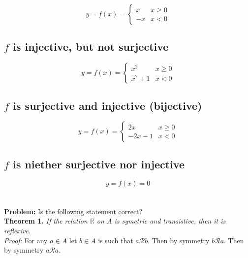 \documentclass[]{article}
\newcommand{\Rel}{\mathcal{R}}
\newcommand{\R}{\mathbb{R}}
\begin{document}
\begin{displaymath}
	y = f(x) =
	\begin{cases}
		x & x \geq 0\\
		-x & x < 0
	\end{cases}
\end{displaymath}


\subsection{$f$ is injective, but not surjective}
\begin{displaymath}
	y = f(x) =
	\begin{cases}
		x^2 & x \geq 0\\
		x^2 + 1 & x < 0
	\end{cases}
\end{displaymath}


\subsection{$f$ is surjective and injective (bijective)}


\begin{displaymath}
	y = f(x) =
	\begin{cases}
		2 x & x \geq 0\\
		-2 x - 1 & x < 0
	\end{cases}
\end{displaymath}


\subsection{$f$ is niether surjective nor injective}

\begin{displaymath}
	y = f(x) = 0
\end{displaymath}












\newpage
\section{}
\textbf{Problem:}
Is the following statement correct?\\

\textbf{Theorem 1.}
\textit{If the relation $\R$ on $A$ is symetric and transistive, then it is reflexive.}\\
\textit{Proof:}
For any $a \in A$ let $b \in A$ is such that $a \Rel b$. Then by symmetry $b \Rel a$. 
Then by symmetry $a \Rel a$.\\
\end{document}
